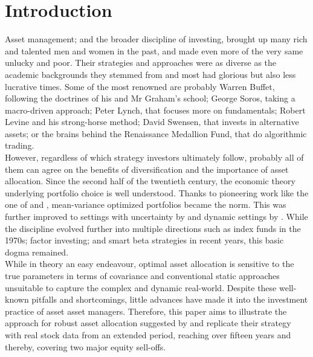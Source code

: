 \section{Introduction}
Asset management; and the broader discipline of investing, brought up many rich and talented men and women in the past, and made even more of the very same unlucky and poor. Their strategies and approaches were as diverse as the academic backgrounds they stemmed from and most had glorious but also less lucrative times.
Some of the most renowned are probably Warren Buffet, following the doctrines of his and Mr Graham's school; George Soros, taking a macro-driven approach; Peter Lynch, that focuses more on fundamentals; Robert Levine and his strong-horse method; David Swensen, that invests in alternative assets; or the brains behind the Renaissance Medallion Fund, that do algorithmic trading.\\
However, regardless of which strategy investors ultimately follow, probably all of them can agree on the benefits of diversification and the importance of asset allocation. Since the second half of the twentieth century, the economic theory underlying portfolio choice is well understood. Thanks to pioneering work like the one of \cite{markowitz_1952} and \cite{tobin_1969}, mean-variance optimized portfolios became the norm. This was further improved to settings with uncertainty by \cite{merton_1969} and dynamic settings by \cite{samuelson_1969}. While the discipline evolved further into multiple directions such as index funds in the 1970s; factor investing; and smart beta strategies in recent years, this basic dogma remained.\\
While in theory an easy endeavour, optimal asset allocation is sensitive to the true parameters in terms of covariance and conventional static approaches unsuitable to capture the complex and dynamic real-world. Despite these well-known pitfalls and shortcomings, little advances have made it into the investment practice of asset asset managers. Therefore, this paper aims to illustrate the approach for robust asset allocation suggested by \cite{anderson_cheng_2016} and replicate their strategy with real stock data from an extended period, reaching over fifteen years and thereby, covering two major equity sell-offs.